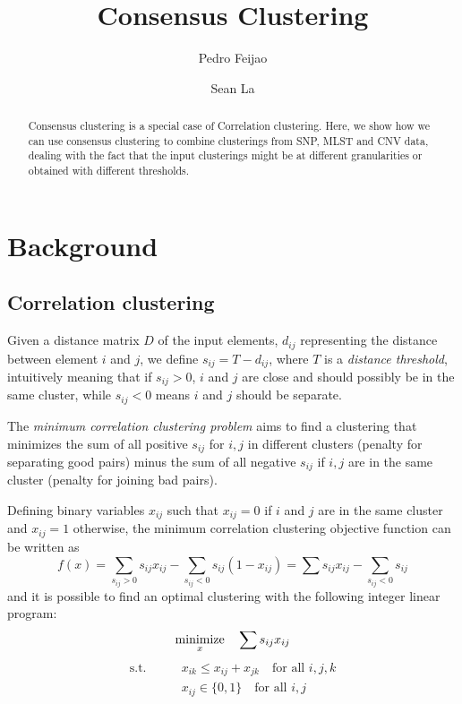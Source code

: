\documentclass[a4paper,UKenglish]{lipics-v2016}
\title{Consensus Clustering}
\author[1]{Pedro Feijao}
\author[2]{Sean La}
\affil[1]{SFU
  \texttt{pfeijao@sfu.ca}}
\affil[2]{SFU
  \texttt{laseanl@sfu.ca}}\\
\begin{document}
\maketitle

\begin{abstract}
Consensus clustering is a special case of Correlation clustering. Here, we show how we can use consensus clustering to combine clusterings from SNP, MLST and CNV data, dealing with the fact that the input clusterings might be at different granularities or obtained with different thresholds.
\end{abstract}

\section{Background}

\subsection{Correlation clustering}

Given a distance matrix $D$ of the input elements, $d_{ij}$ representing the distance between element $i$ and $j$, we define
$s_{ij} = T - d_{ij}$, where $T$ is a \emph{distance threshold}, intuitively meaning that if $s_{ij}>0$, 
$i$ and $j$ are close and should possibly be in the same cluster, while $s_{ij}<0$ means $i$ and $j$ should be separate.

The \emph{minimum correlation clustering problem} aims to find a clustering
that minimizes the sum of all positive $s_{ij}$ for $i,j$ in different
clusters (penalty for separating good pairs) minus the sum of all negative
$s_{ij}$ if $i,j$ are in the same cluster (penalty for joining bad pairs).

Defining binary variables $x_{ij}$ such that $x_{ij} = 0$ if $i$ and $j$ are
in the same cluster and $x_{ij} = 1$ otherwise, the minimum correlation
clustering objective function can be written as
\[
f(x) = \sum_{s_{ij} > 0} s_{ij} x_{ij} - \sum_{s_{ij} <0} s_{ij}(1-x_{ij})  = \sum s_{ij} x_{ij} - \sum_{s_{ij} <0} s_{ij}
\]
and it is possible to find an optimal clustering with the following integer linear program:
\begin{equation}
\underset{x}{\textnormal{minimize}} \quad \sum s_{ij} x_{ij}  
\label{obj_correlation_simple}
\end{equation}
\vspace{-0.8cm}
\begin{align*}
\text{s.t.} \qquad & x_{ik} \leq x_{ij} + x_{jk}  \quad \text{for all }i,j,k  \\
& x_{ij} \in \{0,1\}  \quad \text{for all }i,j 
\end{align*}
\end{document}
